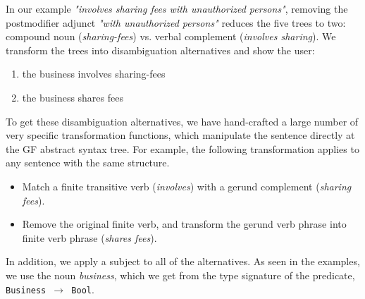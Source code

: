 \documentclass[11pt]{article}
\begin{document}
In our example \textit{"involves sharing fees with unauthorized persons"}, removing the postmodifier adjunct \textit{"with unauthorized persons"}
reduces the five trees to two:
compound noun (\textit{sharing-fees}) vs. verbal complement (\textit{involves sharing}). 
We transform the trees into {disambiguation alternatives} and show the user:

\begin{enumerate}
    \item the business involves sharing-fees
    \item the business shares fees
\end{enumerate}

To get these disambiguation alternatives, we have hand-crafted a large number of very specific transformation functions, which manipulate the sentence directly at the GF abstract syntax tree.
For example, the following transformation applies to any sentence with the same structure. %
    \begin{itemize}
        \item Match a finite transitive verb (\textit{involves}) with a gerund complement (\textit{sharing fees}).
        \item Remove the original finite verb, and transform the gerund verb phrase into finite verb phrase (\textit{shares fees}).
    \end{itemize}

In addition, we apply a subject to all of the alternatives. As seen in the examples, we use the noun \textit{business}, which we get from the type signature of the predicate,  {\small \texttt{Business~$\rightarrow$~Bool}}.

\end{document}
